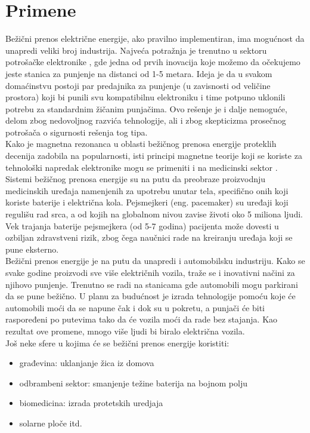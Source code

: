 \documentclass[a4paper]{article}
\begin{document}
\section{Primene}
\label{sec:Primene}
Bežični prenos električne energije, ako pravilno implementiran, ima mogućnost da unapredi veliki broj industrija. Najveća potražnja je trenutno u sektoru potrošačke elektronike \cite{a}, gde jedna od prvih inovacija koje možemo da očekujemo jeste stanica za punjenje na distanci od 1-5 metara. Ideja je da u svakom domaćinstvu postoji par predajnika za punjenje (u zavisnosti od veličine prostora) koji bi punili svu kompatibilnu elektroniku i time potpuno uklonili potrebu za standardnim žičanim punjačima. Ovo rešenje je i dalje nemoguće, delom zbog nedovoljnog razvića tehnologije, ali i zbog skepticizma prosečnog potrošača o sigurnosti rešenja tog tipa. 
\\[10pt]
Kako je magnetna rezonanca u oblasti bežičnog prenosa energije proteklih decenija zadobila na popularnosti, isti principi magnetne teorije koji se koriste za tehnološki napredak elektronike mogu se primeniti i na medicinski sektor \cite{b}. Sistemi bežičnog prenosa energije su na putu da preobraze proizvodnju medicinskih uređaja namenjenih za upotrebu unutar tela, specifično onih koji koriste baterije i električna kola. Pejsmejkeri (eng. pacemaker) su uređaji koji regulišu rad srca, a od kojih na globalnom nivou zavise životi oko 5 miliona ljudi. Vek trajanja baterije pejsmejkera (od 5-7 godina) \cite{c} pacijenta može dovesti u ozbiljan zdravstveni rizik, zbog čega naučnici rade na kreiranju uređaja koji se pune eksterno. 
\\[10pt]
Bežični prenos energije je na putu da unapredi i automobilsku industriju. Kako se svake godine proizvodi sve više električnih vozila, traže se i inovativni načini za njihovo punjenje. Trenutno se radi na stanicama gde automobili mogu parkirani da se pune bežično. U planu za budućnost je izrada tehnologije pomoću koje će automobili moći da se napune čak i dok su u pokretu, a punjači će biti raspoređeni po putevima tako da će vozila moći da rade bez stajanja. Kao rezultat ove promene, mnogo više ljudi bi biralo električna vozila. 
\\[10pt]
Još neke sfere u kojima će se bežični prenos energije koristiti:
\begin{itemize}
 \item građevina: uklanjanje žica iz domova
 \item odbrambeni sektor: smanjenje težine baterija na bojnom polju
 \item biomedicina: izrada protetskih uredjaja
 \item solarne ploče itd.
\end{itemize}
\end{document}
